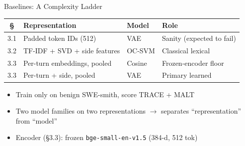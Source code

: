 \documentclass{beamer}
\begin{document}
\begin{frame}{Baselines: A Complexity Ladder}

\footnotesize

\begin{table}
\centering
\setlength{\tabcolsep}{5pt}
\begin{tabular}{@{}clll@{}}
\toprule
\textbf{\S} & \textbf{Representation} & \textbf{Model} & \textbf{Role} \\
\midrule
3.1 & Padded token IDs (512)         & VAE         & Sanity (expected to fail) \\
3.2 & TF-IDF + SVD + side features   & OC-SVM      & Classical lexical \\
3.3 & Per-turn embeddings, pooled    & Cosine      & Frozen-encoder floor \\
3.3 & Per-turn + side, pooled        & VAE         & Primary learned \\
\bottomrule
\end{tabular}
\end{table}

\vspace{0.25cm}

\begin{itemize}\setlength\itemsep{3pt}
  \item Train only on benign SWE-smith, score TRACE + MALT
  \item Two model families on two representations $\to$ separates
    ``representation'' from ``model''
  \item Encoder (\S3.3): frozen \texttt{bge-small-en-v1.5} (384-d, 512 tok)
\end{itemize}

\end{frame}
\end{document}
